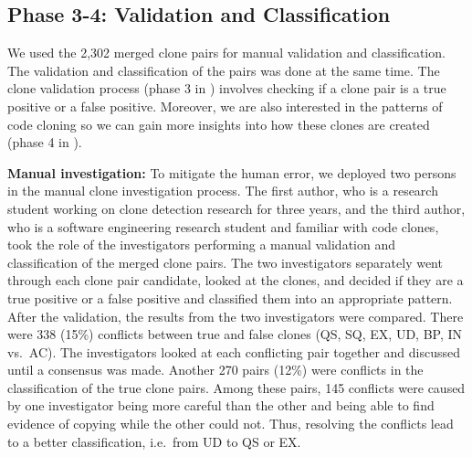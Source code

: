 \documentclass[10pt,journal,compsoc]{IEEEtran}
\begin{document}
\subsection{Phase 3-4: Validation and Classification}
We used the 2,302 merged clone pairs for
manual validation and classification.
The validation and classification of the pairs was done at the same time. 
The clone validation process (phase 3 in ) involves checking 
if a clone pair is a true positive or a false positive. 
Moreover, we are also interested in 
the patterns of code cloning so we can gain more insights into 
how these clones are created (phase 4 in ). 

\textbf{Manual investigation:} 
To mitigate the human error, we deployed two persons in the manual clone
investigation process. The first author, who is a research student working on
clone detection research for three years, and the third author, who is a
software engineering research student and familiar with code clones, took the
role of the investigators performing a manual validation and classification of
the merged clone pairs. The two investigators separately went through each clone
pair candidate, looked at the clones, and decided if they are a true positive or
a false positive and classified them into an appropriate pattern. After the
validation, the results from the two investigators were compared. 
There were 338 (15\%) conflicts between 
true and false clones (QS, SQ, EX, UD, BP, IN vs.~AC).
The investigators looked at each conflicting pair together and
discussed until a consensus was made. 
Another 270 pairs (12\%) were
conflicts in the classification of
the true clone pairs. Among these pairs, 145 conflicts were caused by
one investigator being more careful than the other and being able to find evidence of 
copying while the other could not. Thus, resolving the conflicts lead to a better classification,
 i.e.~from UD to QS or EX.

\end{document}
